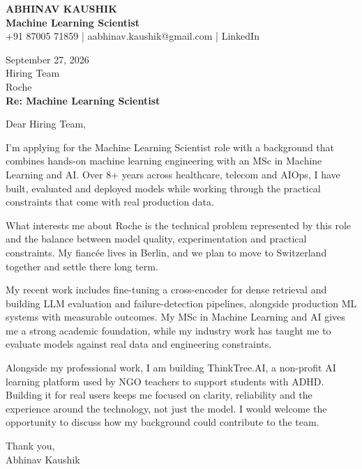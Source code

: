 \documentclass[10pt,a4paper]{article}
\begin{document}
\begin{center}
{\Large\bfseries ABHINAV KAUSHIK}\\[2pt]
{\bfseries Machine Learning Scientist}\\[2pt]
+91 87005 71859 \quad | \quad aabhinav.kaushik@gmail.com \quad | \quad LinkedIn
\end{center}
\vspace{8pt}
September 27, 2026\\[6pt]
Hiring Team\\
Roche\\[4pt]
\textbf{Re: Machine Learning Scientist}

Dear Hiring Team,

I’m applying for the Machine Learning Scientist role with a background that combines hands-on machine learning engineering with an MSc in Machine Learning and AI. Over 8+ years across healthcare, telecom and AIOps, I have built, evaluated and deployed models while working through the practical constraints that come with real production data.

What interests me about Roche is the technical problem represented by this role and the balance between model quality, experimentation and practical constraints. My fiancée lives in Berlin, and we plan to move to Switzerland together and settle there long term.

My recent work includes fine-tuning a cross-encoder for dense retrieval and building LLM evaluation and failure-detection pipelines, alongside production ML systems with measurable outcomes. My MSc in Machine Learning and AI gives me a strong academic foundation, while my industry work has taught me to evaluate models against real data and engineering constraints.

Alongside my professional work, I am building ThinkTree.AI, a non-profit AI learning platform used by NGO teachers to support students with ADHD. Building it for real users keeps me focused on clarity, reliability and the experience around the technology, not just the model. I would welcome the opportunity to discuss how my background could contribute to the team.

Thank you,\\
Abhinav Kaushik
\end{document}
